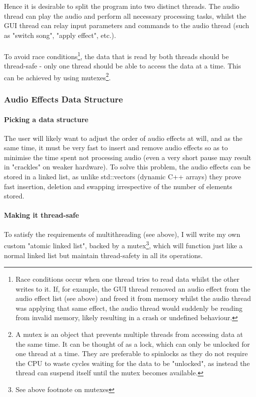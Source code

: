 Hence it is desirable to split the program into two distinct threads. The audio thread can play the audio and perform all necessary processing tasks, whilst the GUI thread can relay input parameters and commands to the audio thread (such as "switch song", "apply effect", etc.).

\paragraph{}
To avoid race conditions\footnote{
	 Race conditions occur when one thread tries to read data whilst the other writes to it. If, for example, the GUI thread removed an audio effect from the audio effect list (see above) and freed it from memory whilst the audio thread was applying that same effect, the audio thread would suddenly be reading from invalid memory, likely resulting in a crash or undefined behaviour.
}, the data that is read by both threads should be thread-safe - only one thread should be able to access the data at a time. This can be achieved by using mutexes\footnote{
	A mutex is an object that prevents multiple threads from accessing data at the same time. It can be thought of as a lock, which can only be unlocked for one thread at a time. They are preferable to spinlocks as they do not require the CPU to waste cycles waiting for the data to be "unlocked", as instead the thread can suspend itself until the mutex becomes available.
}.

\subsubsection{Audio Effects Data Structure}
\paragraph{Picking a data structure} The user will likely want to adjust the order of audio effects at will, and as the same time, it must be very fast to insert and  remove audio effects so as to minimise the time spent not processing audio (even a very short pause may result in "crackles" on weaker hardware). To solve this problem, the audio effects can be stored in a linked list, as unlike std::vectors (dynamic C++ arrays) they prove fast insertion, deletion and swapping irrespective of the number of elements stored.

\paragraph{Making it thread-safe}
To satisfy the requirements of multithreading (see above), I will write my own custom "atomic linked list", backed by a mutex\footnote{
	See above footnote on mutexes
}, which will function just like a normal linked list but maintain thread-safety in all its operations.